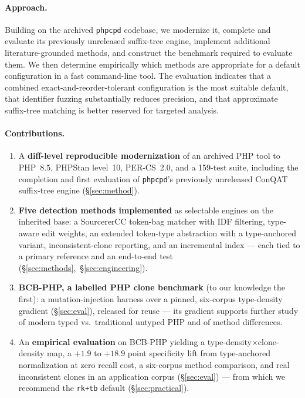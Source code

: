 \documentclass[10pt,a4paper]{article}
\newcounter{prop}[section]
\newcounter{lem}[section]
\begin{document}
\paragraph{Approach.} Building on the archived \texttt{phpcpd} codebase, we modernize it, complete and
evaluate its previously unreleased suffix-tree engine, implement additional literature-grounded
methods, and construct the benchmark required to evaluate them. We then determine empirically which
methods are appropriate for a default configuration in a fast command-line tool. The evaluation
indicates that a combined exact-and-reorder-tolerant configuration is the most suitable default, that
identifier fuzzing substantially reduces precision, and that approximate suffix-tree matching is better
reserved for targeted analysis.

\paragraph{Contributions.}
\begin{enumerate}[leftmargin=1.4em,itemsep=1pt,topsep=2pt]
  \item A \textbf{diff-level reproducible modernization} of an archived PHP tool to PHP~8.5, PHPStan
        level~10, PER-CS~2.0, and a 159-test suite, including the completion and first evaluation of
        \texttt{phpcpd}'s previously unreleased ConQAT suffix-tree engine (\S\ref{sec:method}).
  \item \textbf{Five detection methods implemented} as selectable engines on the inherited base: a
        SourcererCC token-bag matcher with IDF filtering, type-aware edit weights, an extended
        token-type abstraction with a type-anchored variant, inconsistent-clone reporting, and an
        incremental index --- each tied to a primary reference and an end-to-end test
        (\S\ref{sec:methods},~\S\ref{sec:engineering}).
  \item \textbf{BCB-PHP, a labelled PHP clone benchmark} (to our knowledge the first): a
        mutation-injection harness over a pinned, six-corpus type-density gradient (\S\ref{sec:eval}),
        released for reuse --- its gradient supports further study of modern typed vs.\ traditional
        untyped PHP and of method
        differences.
  \item An \textbf{empirical evaluation} on BCB-PHP yielding a type-density$\times$clone-density map, a
        $+1.9$ to $+18.9$ point specificity lift from type-anchored normalization at zero recall cost,
        a six-corpus method comparison, and real inconsistent clones in an application corpus
        (\S\ref{sec:eval}) --- from which we recommend the \texttt{rk+tb} default (\S\ref{sec:practical}).
\end{enumerate}
\end{document}
